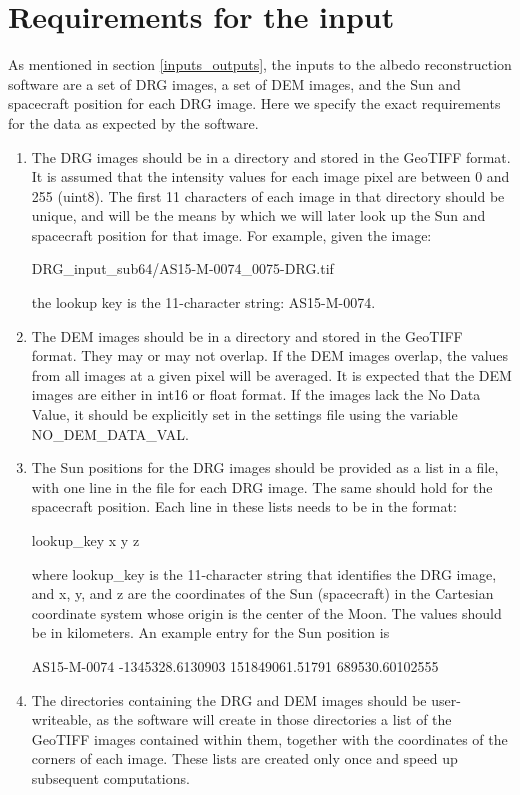 \documentclass[letterpaper,fleqn,11pt]{report}
\begin{document}
\section{Requirements for the input}\label{requirements}

As mentioned in section \ref{inputs_outputs}, the inputs to the albedo reconstruction software are a set of DRG images, a set of DEM images, and the Sun and spacecraft position for each DRG image. Here we specify the exact requirements for the data as expected by the software.

\begin{enumerate}

\item The DRG images should be in a directory and stored in the GeoTIFF format. It is assumed that the intensity values for each image pixel are between 0 and 255 (uint8).  The first 11 characters of each image in that directory should be unique, and will be the means by which we will later look up the Sun and spacecraft position for that image. For example, given the image:

DRG\_input\_sub64/AS15-M-0074\_0075-DRG.tif

the lookup key is the 11-character string: AS15-M-0074.

\item The DEM images should be in a directory and stored in the GeoTIFF
format. They may or may not overlap. If the DEM images overlap, the
values from all images at a given pixel will be averaged. It is expected
that the DEM images are either in int16 or float format. If the
images lack the No Data Value, it should be explicitly set in the
settings file using the variable NO\_DEM\_DATA\_VAL.

\item The Sun positions for the DRG images should be provided as a list in
  a file, with one line in the file for each DRG image. The same should
  hold for the spacecraft position. Each line in these lists needs to
  be in the format: 

lookup\_key x y z

where lookup\_key is the 11-character string that identifies the DRG
image, and x, y, and z are the coordinates of the Sun (spacecraft)
 in the Cartesian coordinate system whose origin is the center of the
 Moon. The values should be in kilometers. An example entry for the Sun
 position is 

AS15-M-0074 -1345328.6130903 151849061.51791 689530.60102555

\item The directories containing the DRG and DEM images should be
  user-writeable, as the software will create in those directories a
  list of the GeoTIFF images contained within them, together with the
  coordinates of the corners of each image. These lists are created
  only once and speed up subsequent computations.

\end{enumerate}
\end{document}
